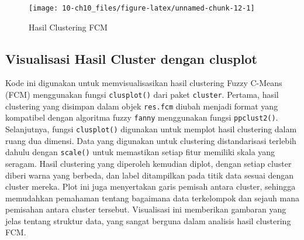 \documentclass[
  oneside]{book}
\newenvironment{Shaded}{\begin{snugshade}}{\end{snugshade}}
\newcommand{\AttributeTok}[1]{\textcolor[rgb]{0.13,0.29,0.53}{#1}}
\newcommand{\ConstantTok}[1]{\textcolor[rgb]{0.56,0.35,0.01}{#1}}
\newcommand{\DecValTok}[1]{\textcolor[rgb]{0.00,0.00,0.81}{#1}}
\newcommand{\FunctionTok}[1]{\textcolor[rgb]{0.13,0.29,0.53}{\textbf{#1}}}
\newcommand{\NormalTok}[1]{#1}
\newcommand{\OtherTok}[1]{\textcolor[rgb]{0.56,0.35,0.01}{#1}}
\newcommand{\SpecialCharTok}[1]{\textcolor[rgb]{0.81,0.36,0.00}{\textbf{#1}}}
\newcommand{\StringTok}[1]{\textcolor[rgb]{0.31,0.60,0.02}{#1}}
\begin{document}
\begin{figure}[h]

{\centering \texttt{[image: 10-ch10\_files/figure-latex/unnamed-chunk-12-1]} 

}

\caption{Hasil Clustering FCM}\label{fig:unnamed-chunk-12}
\end{figure}

\subsection*{Visualisasi Hasil Cluster dengan clusplot}\label{visualisasi-hasil-cluster-dengan-clusplot}

Kode ini digunakan untuk memvisualisasikan hasil clustering Fuzzy C-Means (FCM) menggunakan fungsi \texttt{clusplot()} dari paket \texttt{cluster}. Pertama, hasil clustering yang disimpan dalam objek \texttt{res.fcm} diubah menjadi format yang kompatibel dengan algoritma fuzzy \texttt{fanny} menggunakan fungsi \texttt{ppclust2()}. Selanjutnya, fungsi \texttt{clusplot()} digunakan untuk memplot hasil clustering dalam ruang dua dimensi. Data yang digunakan untuk clustering distandarisasi terlebih dahulu dengan \texttt{scale()} untuk memastikan setiap fitur memiliki skala yang seragam. Hasil clustering yang diperoleh kemudian diplot, dengan setiap cluster diberi warna yang berbeda, dan label ditampilkan pada titik data sesuai dengan cluster mereka. Plot ini juga menyertakan garis pemisah antara cluster, sehingga memudahkan pemahaman tentang bagaimana data terkelompok dan sejauh mana pemisahan antara cluster tersebut. Visualisasi ini memberikan gambaran yang jelas tentang struktur data, yang sangat berguna dalam analisis hasil clustering FCM.

\begin{Shaded}
\end{Shaded}
\end{document}
